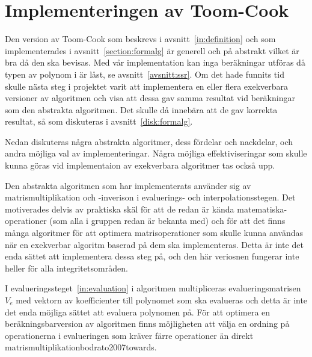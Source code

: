 \section{Implementeringen av Toom-Cook}
Den version av Toom-Cook som beskrevs i avsnitt~\ref{in:definition} och som
implementerades i avsnitt~\ref{section:formalg} är generell och på abstrakt
vilket är bra då den ska bevisas. Med vår implementation kan inga beräkningar
utföras då typen av polynom i \ssr är låst, se avsnitt~\ref{avsnitt:ssr}. Om
det hade funnits tid skulle nästa steg i projektet varit att implementera en
eller flera exekverbara versioner av algoritmen och visa att dessa gav samma
resultat vid beräkningar som den abstrakta algoritmen. Det skulle då innebära
att de gav korrekta resultat, så som diskuteras i avsnitt~\ref{disk:formalg}.

Nedan diskuteras några abstrakta algoritmer, dess fördelar och nackdelar, och
andra möjliga val av implementeringar. Några möjliga effektiviseringar som
skulle kunna göras vid implementaion av exekverbara algoritmer tas också upp.

Den abstrakta algoritmen som har implementerats använder sig av
matrismultiplikation och -inverison i evaluerings- och interpolationsstegen.
Det motiverades delvis av praktiska skäl för att de redan är kända
matematiska-operationer (som alla i gruppen redan är bekanta med) och för att
det finns många algoritmer för att optimera matrisoperationer som skulle kunna
användas när en exekverbar algoritm baserad på dem ska implementeras. Detta är
inte det enda sättet att implementera dessa steg på, och den här veriosnen
fungerar inte heller för alla integritetsområden.



I evalueringssteget~\ref{in:evaluation} i algoritmen multipliceras
evalueringsmatrisen $V_e$ med vektorn av koefficienter till polynomet som ska
evalueras och detta är inte det enda möjliga sättet att evaluera polynomen på.
För att optimera en beräkningsbarversion av algoritmen finns möjligheten att
välja en ordning på operationerna i evalueringen som kräver färre operationer
än direkt matrismultiplikation{bodrato2007towards}.

